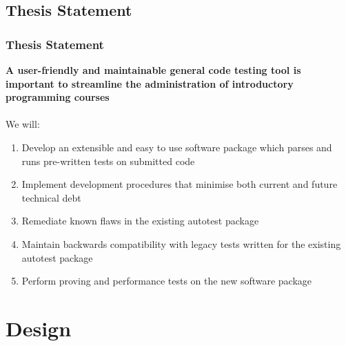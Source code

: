 \documentclass[xcolor, handout]{beamer}
\begin{document}
\subsection{Thesis Statement}
\begin{frame}
	\frametitle{Thesis Statement}
	\textbf{A user-friendly and maintainable general code testing tool is important to streamline the administration of introductory programming courses}
	\\~\\
	\pause
	We will:
	\pause
	\begin{enumerate}
		\item Develop an extensible and easy to use software package which parses and runs pre-written tests on submitted code
		\pause
		\item Implement development procedures that minimise both current and future technical debt
		\pause
		\item Remediate known flaws in the existing autotest package
		\pause
		\item Maintain backwards compatibility with legacy tests written for the existing autotest package
		\pause
		\item Perform proving and performance tests on the new software package
	\end{enumerate}
\end{frame}

\section{Design}
\end{document}

